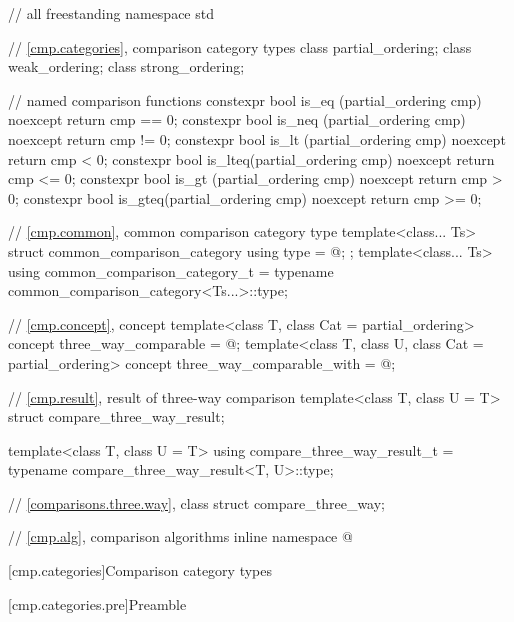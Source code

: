 \begin{codeblock}
// all freestanding
namespace std {
  // \ref{cmp.categories}, comparison category types
  class partial_ordering;
  class weak_ordering;
  class strong_ordering;

  // named comparison functions
  constexpr bool is_eq  (partial_ordering cmp) noexcept { return cmp == 0; }
  constexpr bool is_neq (partial_ordering cmp) noexcept { return cmp != 0; }
  constexpr bool is_lt  (partial_ordering cmp) noexcept { return cmp < 0; }
  constexpr bool is_lteq(partial_ordering cmp) noexcept { return cmp <= 0; }
  constexpr bool is_gt  (partial_ordering cmp) noexcept { return cmp > 0; }
  constexpr bool is_gteq(partial_ordering cmp) noexcept { return cmp >= 0; }

  // \ref{cmp.common}, common comparison category type
  template<class... Ts>
  struct common_comparison_category {
    using type = @\seebelow@;
  };
  template<class... Ts>
    using common_comparison_category_t = typename common_comparison_category<Ts...>::type;

  // \ref{cmp.concept}, concept 
  template<class T, class Cat = partial_ordering>
    concept three_way_comparable = @\seebelow@;
  template<class T, class U, class Cat = partial_ordering>
    concept three_way_comparable_with = @\seebelow@;

  // \ref{cmp.result}, result of three-way comparison
  template<class T, class U = T> struct compare_three_way_result;

  template<class T, class U = T>
    using compare_three_way_result_t = typename compare_three_way_result<T, U>::type;

  // \ref{comparisons.three.way}, class 
  struct compare_three_way;

  // \ref{cmp.alg}, comparison algorithms
  inline namespace @
}
\end{codeblock}

[cmp.categories]{Comparison category types}

[cmp.categories.pre]{Preamble}

